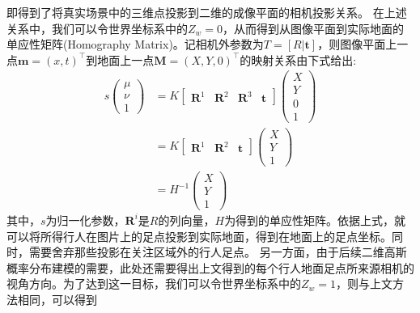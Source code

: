 即得到了将真实场景中的三维点投影到二维的成像平面的相机投影关系。
在上述关系中，我们可以令世界坐标系中的$Z_{w}=0$，从而得到从图像平面到实际地面的单应性矩阵(Homography Matrix)。记相机外参数为$T = [R|\bm{t}]$，则图像平面上一点$\bm{m}=(x,t)^\top$到地面上一点$\bm{M}=(X,Y,0)^\top$的映射关系由下式给出:
\begin{equation}
  \begin{aligned}
    s\left(
      \begin{matrix}
        \mu \\ \nu \\ 1
      \end{matrix}
    \right)
    &=K\left[
      \begin{matrix}
        \bm{R}^{1}&\bm{R}^{2}&\bm{R}^{3}&\bm{t}
      \end{matrix}
    \right]
    \left(
      \begin{matrix}
        X \\ Y \\ 0 \\ 1
      \end{matrix}
    \right) \\
    &=K\left[
      \begin{matrix}
        \bm{R}^{1}&\bm{R}^{2}&\bm{t}
      \end{matrix}
    \right]
    \left(
      \begin{matrix}
        X \\ Y \\ 1
      \end{matrix}
    \right) \\
    &=H^{-1}
    \left(
      \begin{matrix}
        X \\ Y \\ 1
      \end{matrix}
    \right)
  \end{aligned}
\end{equation}
其中，$s$为归一化参数，$\bm{R}^{i}$是$R$的列向量，$H$为得到的单应性矩阵。依据上式，就可以将所得行人在图片上的足点投影到实际地面，得到在地面上的足点坐标。同时，需要舍弃那些投影在关注区域外的行人足点。
另一方面，由于后续二维高斯概率分布建模的需要，此处还需要得出上文得到的每个行人地面足点所来源相机的视角方向。为了达到这一目标，我们可以令世界坐标系中的$Z_{w}=1$，则与上文方法相同，可以得到
